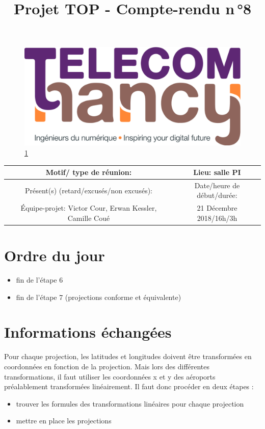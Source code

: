\documentclass{article}
\date{}
\begin{document}
\begin{figure}
    \centering
    \includegraphics[scale=0.05]{logo_TNCY.png}
    \label{fig:logo_tncy}
    \ref{fig:logo_tncy}
\end{figure}
\title{Projet TOP - Compte-rendu n\,°8}
\maketitle
\vspace*{-1cm}

\begin{tabular}{|c|c|}
  \hline
  Motif/ type de réunion: & Lieu: salle PI \\
  \hline
   Présent(s) (retard/excusés/non excusés): &  Date/heure de début/durée:\\
  Équipe-projet: Victor Cour,
                  Erwan Kessler,
                  Camille Coué
 & 21 Décembre 2018/16h/3h\\
  \hline
\end{tabular}


\section{Ordre du jour}

\begin{itemize}
  \item fin de l'étape 6 
  \item fin de l'étape 7 (projections conforme et équivalente) 
\end{itemize}

\section{Informations échangées}
Pour chaque projection, les latitudes et longitudes doivent être transformées en coordonnées en fonction de la projection. Mais lors des différentes transformations, il faut utiliser les coordonnées x et y des aéroports préalablement transformées linéairement.
Il faut donc procéder en deux étapes : 
\begin{itemize}
  \item trouver les formules des transformations linéaires pour chaque projection
  \item mettre en place les projections
\end{itemize}
\end{document}
